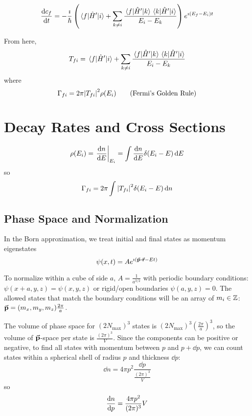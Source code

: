 \documentclass[a4paper,twoside,master.tex]{subfiles}
\begin{document}

\begin{equation}
    \dv{c_f}{t} = - \frac{\imath}{\hbar} \left( \mel{f}{\hat{H}'}{i} + \sum_{k \neq i} \frac{\mel{f}{\hat{H}'}{k} \mel{k}{\hat{H}'}{i}}{E_i - E_k} \right) e^{\imath (E_f - E_i) t}
\end{equation}

From here,
\begin{equation}
    T_{f i} = \mel{f}{\hat{H}'}{i} + \sum_{k \neq i} \frac{\mel{f}{\hat{H}'}{k} \mel{k}{\hat{H}'}{i}}{E_i - E_k} 
\end{equation}
where
\begin{equation}
    \Gamma_{f i} = 2 \pi \abs{T_{f i}}^2 \rho(E_i) \tag{Fermi's Golden Rule}
\end{equation}

\section{Decay Rates and Cross Sections}\label{sec:decay_rates_and_cross_sections}
\begin{equation}
    \rho(E_i) = \eval{\dv{n}{E}}_{E_i} = \int \dv{n}{E} \delta(E_i - E) \dd{E}
\end{equation}
so
\begin{equation}
    \Gamma_{f i} = 2 \pi \int \abs{T_{f i}}^2 \delta(E_i - E) \dd{n}
\end{equation}

\subsection{Phase Space and Normalization}\label{sub:phase_space_and_normalization_}

In the Born approximation, we treat initial and final states as momentum eigenstates
\begin{equation}
    \psi(x,t) = A e^{\imath(\va{p} \vdot \va{r} - Et)}
\end{equation}

To normalize within a cube of side $ a $, $ A = \frac{1}{a^{3/2}} $ with periodic boundary conditions: $ \psi(x+a, y, z) = \psi(x,y,z) $ or rigid/open boundaries $ \psi(a,y,z) = 0 $. The allowed states that match the boundary conditions will be an array of $ m_i \in \mathbb{Z} $: $ \va{p} = (m_x, m_y, m_z) \frac{2 \pi}{a} $.

The volume of phase space for $ (2 N_{\text{max}})^3 $ states is $ (2 N_{\text{max}})^3 \left( \frac{2 \pi}{a} \right)^3 $, so the volume of $ \va{p} $-space per state is $ \frac{(2 \pi)^3}{V} $. Since the components can be positive or negative, to find all states with momentum between $ p $ and $ p + \dd{p} $, we can count states within a spherical shell of radius $ p $ and thickness $ \dd{p} $:
\begin{equation}
    \dd{n} = 4 \pi p^2 \frac{\dd{p}}{\frac{(2 \pi)^3}{V}}
\end{equation}
so
\begin{equation}
    \dv{n}{p} = \frac{4 \pi p^2}{(2 \pi)^3} V
\end{equation}
\end{document}
